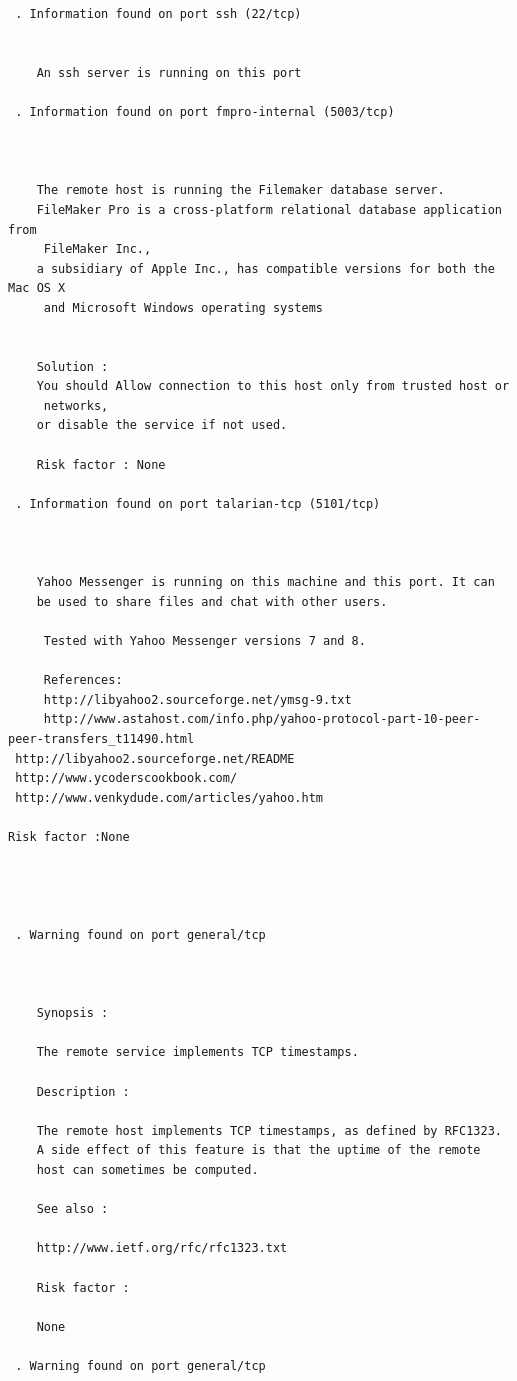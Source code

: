 \documentclass[twoside]{article}
\begin{document}
\begin{lstlisting}
 . Information found on port ssh (22/tcp)


    An ssh server is running on this port

 . Information found on port fmpro-internal (5003/tcp)


    
    The remote host is running the Filemaker database server. 
    FileMaker Pro is a cross-platform relational database application from
     FileMaker Inc., 
    a subsidiary of Apple Inc., has compatible versions for both the Mac OS X
     and Microsoft Windows operating systems
    
    
    Solution :
    You should Allow connection to this host only from trusted host or
     networks,
    or disable the service if not used.
    
    Risk factor : None

 . Information found on port talarian-tcp (5101/tcp)


    
    Yahoo Messenger is running on this machine and this port. It can
    be used to share files and chat with other users.
    
     Tested with Yahoo Messenger versions 7 and 8.
    
     References:
     http://libyahoo2.sourceforge.net/ymsg-9.txt
     http://www.astahost.com/info.php/yahoo-protocol-part-10-peer-peer-transfers_t11490.html
 http://libyahoo2.sourceforge.net/README
 http://www.ycoderscookbook.com/
 http://www.venkydude.com/articles/yahoo.htm

Risk factor :None




 . Warning found on port general/tcp


    
    Synopsis :
    
    The remote service implements TCP timestamps.
    
    Description :
    
    The remote host implements TCP timestamps, as defined by RFC1323.
    A side effect of this feature is that the uptime of the remote 
    host can sometimes be computed.
    
    See also :
    
    http://www.ietf.org/rfc/rfc1323.txt
    
    Risk factor : 
    
    None

 . Warning found on port general/tcp



\end{lstlisting}
\end{document}
